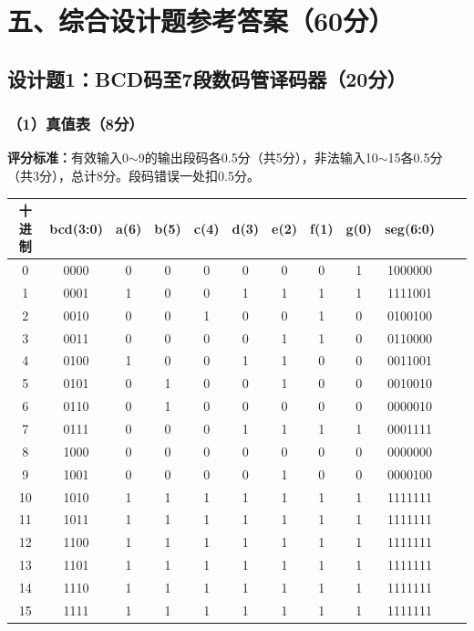 \newpage

\section{五、综合设计题参考答案（60分）}

\subsection{设计题1：BCD码至7段数码管译码器（20分）}

\subsubsection{（1）真值表（8分）}

\begin{framed}
\textbf{评分标准：}有效输入0$\sim$9的输出段码各0.5分（共5分），非法输入10$\sim$15各0.5分（共3分），总计8分。段码错误一处扣0.5分。
\end{framed}

\vspace{0.3cm}
\begin{center}
\begin{tabular}{|c|c|c|c|c|c|c|c|c|c|c|c|}
\hline
\textbf{十进制} & \textbf{bcd(3:0)} & \textbf{a(6)} & \textbf{b(5)} & \textbf{c(4)} & \textbf{d(3)} & \textbf{e(2)} & \textbf{f(1)} & \textbf{g(0)} & \textbf{seg(6:0)} \\
\hline
0 & 0000 & 0 & 0 & 0 & 0 & 0 & 0 & 1 & 1000000 \\
1 & 0001 & 1 & 0 & 0 & 1 & 1 & 1 & 1 & 1111001 \\
2 & 0010 & 0 & 0 & 1 & 0 & 0 & 1 & 0 & 0100100 \\
3 & 0011 & 0 & 0 & 0 & 0 & 1 & 1 & 0 & 0110000 \\
4 & 0100 & 1 & 0 & 0 & 1 & 1 & 0 & 0 & 0011001 \\
5 & 0101 & 0 & 1 & 0 & 0 & 1 & 0 & 0 & 0010010 \\
6 & 0110 & 0 & 1 & 0 & 0 & 0 & 0 & 0 & 0000010 \\
7 & 0111 & 0 & 0 & 0 & 1 & 1 & 1 & 1 & 0001111 \\
8 & 1000 & 0 & 0 & 0 & 0 & 0 & 0 & 0 & 0000000 \\
9 & 1001 & 0 & 0 & 0 & 0 & 1 & 0 & 0 & 0000100 \\
10 & 1010 & 1 & 1 & 1 & 1 & 1 & 1 & 1 & 1111111 \\
11 & 1011 & 1 & 1 & 1 & 1 & 1 & 1 & 1 & 1111111 \\
12 & 1100 & 1 & 1 & 1 & 1 & 1 & 1 & 1 & 1111111 \\
13 & 1101 & 1 & 1 & 1 & 1 & 1 & 1 & 1 & 1111111 \\
14 & 1110 & 1 & 1 & 1 & 1 & 1 & 1 & 1 & 1111111 \\
15 & 1111 & 1 & 1 & 1 & 1 & 1 & 1 & 1 & 1111111 \\
\hline
\end{tabular}
\end{center}
\vspace{0.3cm}

